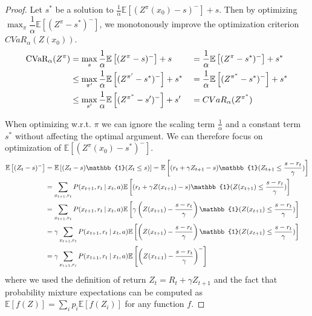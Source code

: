 \begin{proof}

Let $s^*$ be a solution to $\frac{1}{\alpha}\mathbb{E}\left[ (Z^\pi(x_0)-s)^-\right] + s$. Then by optimizing $\max_\pi \dfrac{1}{\alpha}\mathbb{E}
\left[ (Z^\pi-s^*)^-\right]$, we monotonously improve the optimization criterion $CVaR_\alpha(Z(x_0))$.
\begin{align*}
\text{CVaR}_\alpha(Z^{\pi}) &= \max_{s}\dfrac{1}{\alpha}\mathbb{E}\left[ (Z^{\pi}-s)^-\right] + s &&= \dfrac{1}{\alpha}\mathbb{E}\left[ (Z^{\pi}-s^*)^-\right] + s^* \\
&\le \max_{\pi'}\dfrac{1}{\alpha}\mathbb{E} \left[ (Z^{\pi'}-s^*)^-\right] + s^* &&= \dfrac{1}{\alpha}\mathbb{E}\left[ (Z^{\pi^*}-s^*)^-\right] + s^*\\
 &\le \max_{s'}\dfrac{1}{\alpha}\mathbb{E}\left[ (Z^{\pi^*}-s')^-\right] + s' &&= CVaR_\alpha(Z^{\pi^*})
\end{align*}

When optimizing w.r.t. $\pi$ we can ignore the scaling term $\frac{1}{\alpha}$ and a constant term $s^*$ without affecting the optimal argument. We can therefore focus on optimization of $\mathbb{E}\left[ (Z^\pi(x_0)-s^*)^-\right]$.
\begin{equation}
\begin{split}
\mathbb{E}\left[(Z_t-s)^-\right] &= \mathbb{E}\left[(Z_t-s)\mathbb{1}(Z_t\le s)\right] = \mathbb{E}\left[(r_t + \gamma Z_{t+1}-s)\mathbb{1}(Z_{t+1}\le \dfrac{s - r_t}{\gamma})\right]\\
&= \sum_{x_{t+1}, r_t} P(x_{t+1}, r_t \given x_t, a)\mathbb{E}\left[(r_t + \gamma Z(x_{t+1})-s)\mathbb{1}(Z(x_{t+1})\le \dfrac{s - r_t}{\gamma})\right]\\
&= \sum_{x_{t+1}, r_t} P(x_{t+1}, r_t \given x_t, a)\mathbb{E}\left[\gamma\left(Z(x_{t+1})-\dfrac{s-r_t}{\gamma}\right)\mathbb{1}(Z(x_{t+1})\le \dfrac{s - r_t}{\gamma})\right]\\
&= \gamma\sum_{x_{t+1}, r_t} P(x_{t+1}, r_t \given x_t, a)\mathbb{E}\left[\left(Z(x_{t+1})-\dfrac{s-r_t}{\gamma}\right)\mathbb{1}(Z(x_{t+1})\le \dfrac{s - r_t}{\gamma})\right]\\
&= \gamma\sum_{x_{t+1}, r_t} P(x_{t+1}, r_t \given x_t, a)\mathbb{E}\left[\left(Z(x_{t+1}) - \dfrac{s - r_t}{\gamma}\right)^-\right]
\end{split}
\end{equation}
where we used the definition of return $Z_t = R_t + \gamma Z_{t+1}$ and the fact that probability mixture expectations can be computed as $\mathbb{E}[f(Z)] = \sum_i p_i \mathbb{E}[f(Z_i)]$ for any function $f$.


\end{proof}
